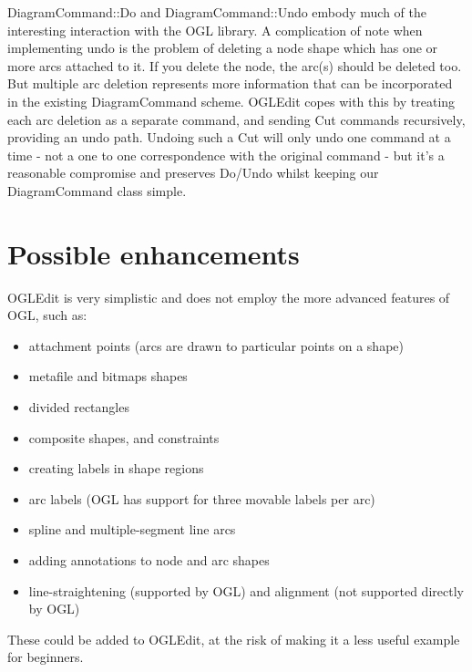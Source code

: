 DiagramCommand::Do and DiagramCommand::Undo embody much of the
interesting interaction with the OGL library. A complication of note
when implementing undo is the problem of deleting a node shape which has
one or more arcs attached to it. If you delete the node, the arc(s)
should be deleted too. But multiple arc deletion represents more information
that can be incorporated in the existing DiagramCommand scheme. OGLEdit
copes with this by treating each arc deletion as a separate command, and
sending Cut commands recursively, providing an undo path. Undoing such a
Cut will only undo one command at a time - not a one to one
correspondence with the original command - but it's a reasonable
compromise and preserves Do/Undo whilst keeping our DiagramCommand class
simple.

\section{Possible enhancements}

OGLEdit is very simplistic and does not employ the more advanced features
of OGL, such as:

\begin{itemize}\itemsep=0pt
\item attachment points (arcs are drawn to particular points on a shape)
\item metafile and bitmaps shapes
\item divided rectangles
\item composite shapes, and constraints
\item creating labels in shape regions
\item arc labels (OGL has support for three movable labels per arc)
\item spline and multiple-segment line arcs
\item adding annotations to node and arc shapes
\item line-straightening (supported by OGL) and alignment (not supported directly by OGL)
\end{itemize}

These could be added to OGLEdit, at the risk of making it a less
useful example for beginners.
